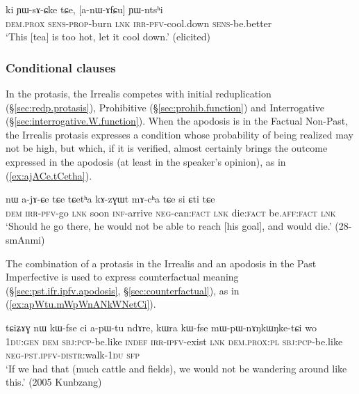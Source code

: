 \begin{exe}
\ex \label{ex:athWGindZi.YWntshi}
\gll ki ɲɯ-sɤ-ɕke tɕe, [a-nɯ-ɤfɕu] ɲɯ-ntsʰi \\
\textsc{dem}.\textsc{prox} \textsc{sens}-\textsc{prop}-burn \textsc{lnk} \textsc{irr}-\textsc{pfv}-cool.down \textsc{sens}-be.better \\
\glt `This [tea] is too hot, let it cool down.' (elicited)
\end{exe}

\subsubsection{Conditional clauses} \label{sec:irrealis.conditional}
   
In the protasis, the Irrealis competes with initial reduplication (§\ref{sec:redp.protasis}), Prohibitive (§\ref{sec:prohib.function}) and Interrogative (§\ref{sec:interrogative.W.function}). When the apodosis is in the Factual Non-Past, the Irrealis protasis expresses a condition whose probability of being realized may not be high, but which, if it is verified, almost certainly brings the outcome expressed in the apodosis (at least in the speaker's opinion), as in (\ref{ex:ajACe.tCetha}).

\begin{exe}
\ex \label{ex:ajACe.tCetha}
\gll nɯ a-jɤ-ɕe tɕe tɕetʰa kɤ-zɣɯt mɤ-cʰa tɕe si ɕti tɕe \\
\textsc{dem} \textsc{irr}-\textsc{pfv}-go \textsc{lnk} soon \textsc{inf}-arrive \textsc{neg}-can:\textsc{fact} \textsc{lnk} die:\textsc{fact} be.\textsc{aff}:\textsc{fact} \textsc{lnk} \\
\glt `Should he go there, he would not be able to reach [his goal], and would die.' (28-smAnmi)
\end{exe}

The combination of a protasis in the Irrealis and an apodosis in the Past Imperfective is used to express counterfactual meaning (§\ref{sec:pst.ifr.ipfv.apodosis}, §\ref{sec:counterfactual}), as in (\ref{ex:apWtu.mWpWnANkWNetCi}).

\begin{exe}
\ex \label{ex:apWtu.mWpWnANkWNetCi}
\gll tɕiʑɤɣ nɯ kɯ-fse ci a-pɯ-tu ndɤre, kɯra kɯ-fse mɯ-pɯ-nɤŋkɯŋke-tɕi wo \\
\textsc{1du}:\textsc{gen} \textsc{dem} \textsc{sbj}:\textsc{pcp}-be.like \textsc{indef} \textsc{irr}-\textsc{ipfv}-exist \textsc{lnk} \textsc{dem}.\textsc{prox}:\textsc{pl} \textsc{sbj}:\textsc{pcp}-be.like \textsc{neg}-\textsc{pst}.\textsc{ipfv}-\textsc{distr}:walk-\textsc{1du} \textsc{sfp} \\
\glt `If we had that (much cattle and fields), we would not be wandering around like this.' (2005 Kunbzang)
\end{exe}


